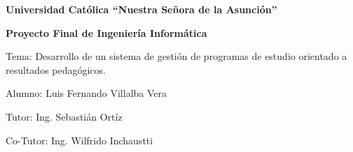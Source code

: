 \documentclass[10pt]{article}
\begin{document}
	\begin{center}
		\thispagestyle{fancy}
		{\Large\bfseries Universidad Católica \enquote{Nuestra Señora de la Asunción} \par}
			\vspace{2mm}
		{\Large\bfseries Proyecto Final de Ingeniería Informática\par}
	    		\vspace{2mm}

	   	Tema: Desarrollo de un sistema de gestión de programas de estudio orientado a resultados pedagógicos.
	    		\vspace{1mm}
	    
	    Alumno: Luis Fernando Villalba Vera
	    		\vspace{1mm}
	   	
	   	Tutor: Ing. Sebastián Ortíz
	    		\vspace{1mm}
	   	
	   	Co-Tutor: Ing. Wilfrido Inchaustti
        
	\end{center}













\printbibliography[heading=bibintoc,title={Bibliografía}]
\end{document}
